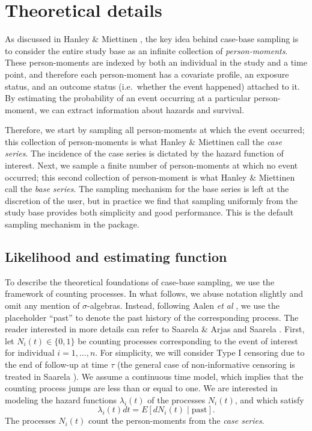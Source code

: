 \hypertarget{theory}{%
\section{Theoretical details}\label{theory}}

As discussed in Hanley \& Miettinen \citeyearpar{hanley2009fitting}, the
key idea behind case-base sampling is to consider the entire study base
as an infinite collection of \emph{person-moments}. These person-moments
are indexed by both an individual in the study and a time point, and
therefore each person-moment has a covariate profile, an exposure
status, and an outcome status (i.e.~whether the event happened) attached
to it. By estimating the probability of an event occurring at a
particular person-moment, we can extract information about hazards and
survival.

Therefore, we start by sampling all person-moments at which the event
occurred; this collection of person-moments is what Hanley \& Miettinen
call the \emph{case series}. The incidence of the case series is
dictated by the hazard function of interest. Next, we sample a finite
number of person-moments at which no event occurred; this second
collection of person-moment is what Hanley \& Miettinen call the
\emph{base series}. The sampling mechanism for the base series is left
at the discretion of the user, but in practice we find that sampling
uniformly from the study base provides both simplicity and good
performance. This is the default sampling mechanism in the package.

\hypertarget{likelihood-and-estimating-function}{%
\subsection{Likelihood and estimating
function}\label{likelihood-and-estimating-function}}

To describe the theoretical foundations of case-base sampling, we use
the framework of counting processes. In what follows, we abuse notation
slightly and omit any mention of \(\sigma\)-algebras. Instead, following
Aalen \textit{et al} \citeyearpar{aalen2008survival}, we use the
placeholder ``past'' to denote the past history of the corresponding
process. The reader interested in more details can refer to Saarela \&
Arjas \citeyearpar{saarela2015non} and Saarela
\citeyearpar{saarela2016case}. First, let \(N_{i}(t) \in \{0, 1\}\) be
counting processes corresponding to the event of interest for individual
\(i=1, \ldots,n\). For simplicity, we will consider Type I censoring due
to the end of follow-up at time \(\tau\) (the general case of
non-informative censoring is treated in Saarela
\citeyearpar{saarela2016case}). We assume a continuous time model, which
implies that the counting process jumps are less than or equal to one.
We are interested in modeling the hazard functions \(\lambda_{i}(t)\) of
the processes \(N_i(t)\), and which satisfy
\[\lambda_{i}(t) dt = E[dN_{i}(t)\mid \mathrm{past}].\] The processes
\(N_i(t)\) count the person-moments from the \emph{case series}.


